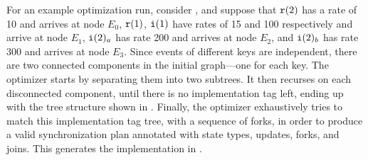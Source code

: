 \begin{example}
\label{dgs:example:optimization}
For an example optimization run, consider ,
and suppose that $\texttt{r}(2)$ has a rate of 10 and arrives at node $E_0$,
$\texttt{r}(1)$, $\texttt{i}(1)$ have rates of 15 and 100 respectively and arrive at node $E_1$,
$\texttt{i}(2)_a$ has rate 200 and arrives at node $E_2$,
and $\texttt{i}(2)_b$ has rate 300 and arrives at node $E_3$.
Since events of different keys are independent, there are
two connected components in the initial graph---one for each
key. The optimizer starts by separating them into two
subtrees. It then recurses on each disconnected component, until there
is no implementation tag left, ending up with the tree structure shown
in . Finally, the optimizer
exhaustively tries to match this implementation tag tree, with a
sequence of forks, in order to produce a valid synchronization plan
annotated with state types, updates, forks, and joins.
This generates the implementation in .
\end{example}

